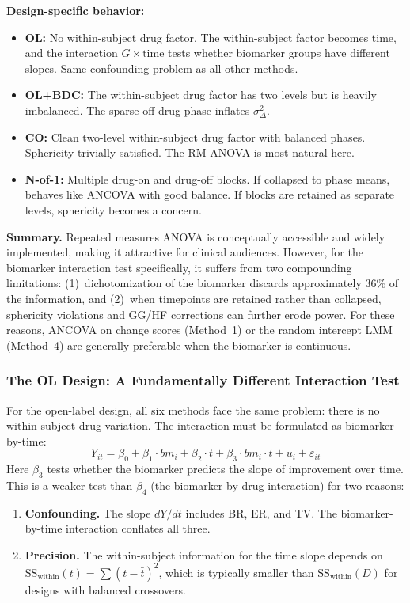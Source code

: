 \documentclass[11pt,letterpaper]{article}
\begin{document}
\textbf{Design-specific behavior:}
\begin{itemize}[nosep]
\item \textbf{OL:} No within-subject drug factor. The within-subject
  factor becomes time, and the interaction $G \times \text{time}$ tests
  whether biomarker groups have different slopes. Same confounding
  problem as all other methods.
\item \textbf{OL+BDC:} The within-subject drug factor has two levels
  but is heavily imbalanced. The sparse off-drug phase inflates
  $\sigma^2_\Delta$.
\item \textbf{CO:} Clean two-level within-subject drug factor with
  balanced phases. Sphericity trivially satisfied. The RM-ANOVA is most
  natural here.
\item \textbf{N-of-1:} Multiple drug-on and drug-off blocks. If
  collapsed to phase means, behaves like ANCOVA with good balance. If
  blocks are retained as separate levels, sphericity becomes a concern.
\end{itemize}

\textbf{Summary.} Repeated measures ANOVA is conceptually accessible and
widely implemented, making it attractive for clinical audiences. However,
for the biomarker interaction test specifically, it suffers from two
compounding limitations: (1)~dichotomization of the biomarker discards
approximately 36\% of the information, and (2)~when timepoints are
retained rather than collapsed, sphericity violations and GG/HF
corrections can further erode power. For these reasons, ANCOVA on change
scores (Method~1) or the random intercept LMM (Method~4) are generally
preferable when the biomarker is continuous.

\subsubsection{The OL Design: A Fundamentally Different Interaction Test}

For the open-label design, all six methods face the same problem: there
is no within-subject drug variation. The interaction must be formulated
as biomarker-by-time:
\[
Y_{it} = \beta_0 + \beta_1 \cdot bm_i + \beta_2 \cdot t
+ \beta_3 \cdot bm_i \cdot t + u_i + \varepsilon_{it}
\]
Here $\beta_3$ tests whether the biomarker predicts the slope of
improvement over time. This is a weaker test than $\beta_4$ (the
biomarker-by-drug interaction) for two reasons:
\begin{enumerate}[nosep]
\item \textbf{Confounding.} The slope $dY/dt$ includes BR, ER, and TV.
  The biomarker-by-time interaction conflates all three.
\item \textbf{Precision.} The within-subject information for the time
  slope depends on
  $\text{SS}_{\text{within}}(t) = \sum(t - \bar{t})^2$, which is
  typically smaller than $\text{SS}_{\text{within}}(D)$ for designs
  with balanced crossovers.
\end{enumerate}
\end{document}
